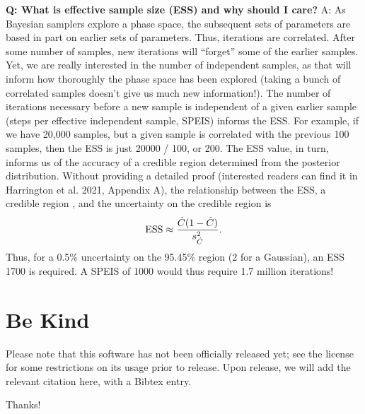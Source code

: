 \documentclass[letterpaper, 12pt]{article}
\begin{document}
\noindent \textbf{Q: What is effective sample size (ESS) and why should I care?}
A: As Bayesian samplers explore a phase space, the subsequent sets of parameters
are based in part on earlier sets of parameters.  Thus, iterations are 
correlated.  After some number of samples, new iterations will ``forget'' some 
of the earlier samples.  Yet, we are really interested in the number of 
independent samples, as that will inform how thoroughly the phase space has 
been explored (taking a bunch of correlated samples doesn't give us much new 
information!).  The number of iterations necessary before a new sample is 
independent of a given earlier sample (steps per effective independent sample, 
SPEIS) informs the ESS.  For example, if we have 20,000 samples, but a given 
sample is correlated with the previous 100 samples, then the ESS is just 
20000 / 100, or 200.  The ESS value, in turn, informs us of the accuracy of 
a credible region determined from the posterior distribution.  Without 
providing a detailed proof (interested readers can find it in Harrington et 
al. 2021, Appendix A), the relationship between the ESS, a credible region 
, and the uncertainty on the credible region 
 is
\begin{equation}
{\rm ESS} \approx \frac{\hat{C}(1-\hat{C})}{s\sbp{\hat{C}}{2}}.
\end{equation}
Thus, for a 0.5\% uncertainty on the 95.45\% region (2\math{\sigma} for a 
Gaussian), an ESS \math{\approx} 1700 is required.  A SPEIS of 1000 would 
thus require 1.7 million iterations!


\section{Be Kind}
\label{sec:bekind}
Please note that this software has not been officially released yet; see the 
license for some restrictions on its usage prior to release.  Upon release, 
we will add the relevant citation here, with a Bibtex entry.

\noindent Thanks!


\end{document}

